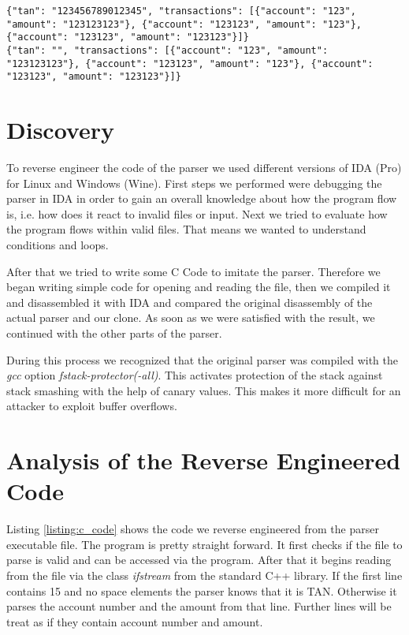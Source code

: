 \begin{lstlisting}[caption=JSON Output,label=listing:json_output]
{"tan": "123456789012345", "transactions": [{"account": "123", "amount": "123123123"}, {"account": "123123", "amount": "123"}, {"account": "123123", "amount": "123123"}]}
{"tan": "", "transactions": [{"account": "123", "amount": "123123123"}, {"account": "123123", "amount": "123"}, {"account": "123123", "amount": "123123"}]}
\end{lstlisting}

\section{Discovery}

To reverse engineer the code of the parser we used different versions of IDA (Pro) for Linux and Windows (Wine). First steps we performed were debugging the parser in IDA in order to gain an overall knowledge about how the program flow is, i.e. how does it react to invalid files or input. Next we tried to evaluate how the program flows within valid files. That means we wanted to understand conditions and loops.

After that we tried to write some C Code to imitate the parser. Therefore we began writing simple code for opening and reading the file, then we compiled it and disassembled it with IDA and compared the original disassembly of the actual parser and our clone. As soon as we were satisfied with the result, we continued with the other parts of the parser.

During this process we recognized that the original parser was compiled with the \textit{gcc} option \textit{fstack-protector(-all)}. This activates protection of the stack against stack smashing with the help of canary values. This makes it more difficult for an attacker to exploit buffer overflows.

\section{Analysis of the Reverse Engineered Code}

Listing \ref{listing:c_code}  shows the code we reverse engineered from the parser executable file. The program is pretty straight forward. It first checks if the file to parse is valid and can be accessed via the program. After that it begins reading from the file via the class \textit{ifstream} from the standard C++ library. If the first line contains 15 and no space elements the parser knows that it is TAN. Otherwise it parses the account number and the amount from that line. Further lines will be treat as if they contain account number and amount.

